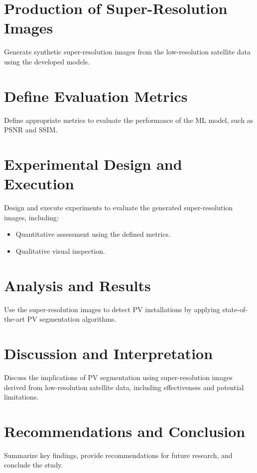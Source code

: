 \section{Production of Super-Resolution Images}

Generate synthetic super-resolution images from the low-resolution satellite data using the developed models.

\section{Define Evaluation Metrics}

Define appropriate metrics to evaluate the performance of the ML model, such as PSNR and SSIM.

\section{Experimental Design and Execution}

Design and execute experiments to evaluate the generated super-resolution images, including:

\begin{itemize}
  \item Quantitative assessment using the defined metrics.
  \item Qualitative visual inspection.
\end{itemize}

\section{Analysis and Results}

Use the super-resolution images to detect PV installations by applying state-of-the-art PV segmentation algorithms.

\section{Discussion and Interpretation}

Discuss the implications of PV segmentation using super-resolution images derived from low-resolution satellite data, including effectiveness and potential limitations.

\section{Recommendations and Conclusion}

Summarize key findings, provide recommendations for future research, and conclude the study.

